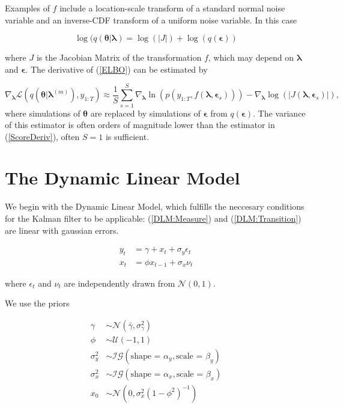\documentclass[12pt,a4paper]{article}%
\numberwithin{equation}{section}
\begin{document}
Examples of $f$ include a location-scale transform of a standard normal noise variable and an inverse-CDF transform of a uniform noise variable. In this case

\begin{equation}
\label{ReparamDist}
\log(q(\boldsymbol{\theta} | \boldsymbol{\lambda}) = \log(|J|) + \log(q(\boldsymbol{\epsilon}))
\end{equation}

where $J$ is the Jacobian Matrix of the transformation $f$, which may depend on $\boldsymbol{\lambda}$ and $\boldsymbol{\epsilon}$. The derivative of (\ref{ELBO}) can be estimated by

\begin{equation}
\label{ReparamDeriv}
\nabla_{\boldsymbol{\lambda}}\mathcal{L}(q(\boldsymbol{\theta} | \boldsymbol{\lambda}^{(m)}), y_{1:T}) \approx \frac{1}{S}\sum_{s=1}^{S} \nabla_{\boldsymbol{\lambda}} \ln (p(y_{1:T}, f(\boldsymbol{\lambda}, \boldsymbol{\epsilon}_s))) - \nabla_{\boldsymbol{\lambda}}\log(|J(\boldsymbol{\lambda}, \boldsymbol{\epsilon}_s)|),
\end{equation}
where simulations of $\boldsymbol{\theta}$ are replaced by simulations of $\boldsymbol{\epsilon}$ from $q(\boldsymbol{\epsilon})$. The variance of this estimator is often orders of magnitude lower than the estimator in (\ref{ScoreDeriv}), often $S=1$ is sufficient.

\section{The Dynamic Linear Model}

We begin with the Dynamic Linear Model, which fulfills the neccesary conditions for the Kalman filter to be applicable: (\ref{DLM:Measure}) and (\ref{DLM:Transition}) are linear with gaussian errors.

\begin{align}
y_t &= \gamma + x_t + \sigma_y \epsilon_t \label{DLM:Measure}\\
x_t &= \phi x_{t-1} + \sigma_x \nu_t \label{DLM:Transition}
\end{align}

where $\epsilon_t$ and $\nu_t$ are independently drawn from $\mathcal{N}(0, 1).$

We use the priors

\begin{align}
\gamma &\sim \mathcal{N}(\bar{\gamma}, \sigma^2_{\gamma}) \\
\phi &\sim \mathcal{U}(-1, 1) \\
\sigma^2_y &\sim \mathcal{IG}(\mbox{shape = }\alpha_y, \mbox{scale = }\beta_y) \\
\sigma^2_x &\sim \mathcal{IG}(\mbox{shape = }\alpha_x, \mbox{scale = }\beta_x) \\
x_0 &\sim \mathcal{N}(0, \sigma^2_x(1 - \phi^2)^{-1})
\end{align}
\end{document}
